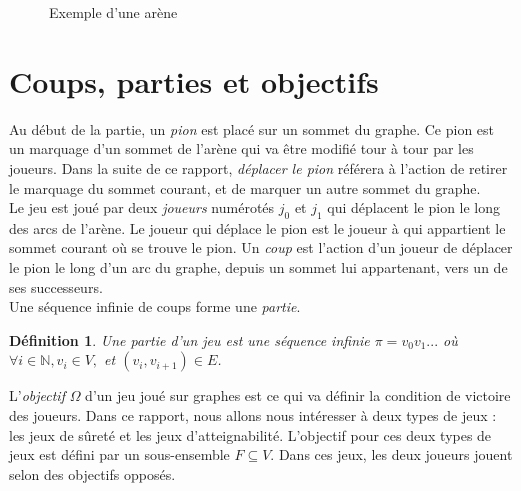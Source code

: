 \documentclass[12pt,a4paper,oneside,titlepage]{report}
\newtheorem{defi}{D\'efinition}[section]
\begin{document}
\begin{figure}[h]
\centering
{}
\caption{Exemple d'une arène}
\label{fig:arena}
\end{figure}
\section{Coups, parties et objectifs}
Au début de la partie, un \emph{pion} est placé sur un sommet du graphe. Ce pion est un marquage d'un sommet de l'arène qui va être modifié tour à tour par les joueurs. Dans la suite de ce rapport, \emph{déplacer le pion} référera à l'action de retirer le marquage du sommet courant, et de marquer un autre sommet du graphe.\\
Le jeu est joué par deux \emph{joueurs} numérotés $j_0$ et $j_1$ qui déplacent le pion le long des arcs de l'arène. Le joueur qui déplace le pion est le joueur à qui appartient le sommet courant où se trouve le pion. Un \emph{coup} est l'action d'un joueur de déplacer le pion le long d'un arc du graphe, depuis un sommet lui appartenant, vers un de ses successeurs.\\
Une séquence infinie de coups forme une \emph{partie}.
\begin{defi}
	Une \emph{partie} d'un jeu est une séquence infinie $\pi=v_0 v_1 ...$ où $\forall i\in \mathbb{N},v_i \in V, $ et $(v_i, v_{i+1})\in E$.
\end{defi}
\noindent L'\emph{objectif} $\Omega$ d'un jeu joué sur graphes est ce qui va définir la condition de victoire des joueurs. Dans ce rapport, nous allons nous intéresser à deux types de jeux : les jeux de sûreté et les jeux d'atteignabilité. L'objectif pour ces deux types de jeux est défini par un sous-ensemble $F\subseteq V$. Dans ces jeux, les deux joueurs jouent selon des objectifs opposés.
\end{document}
